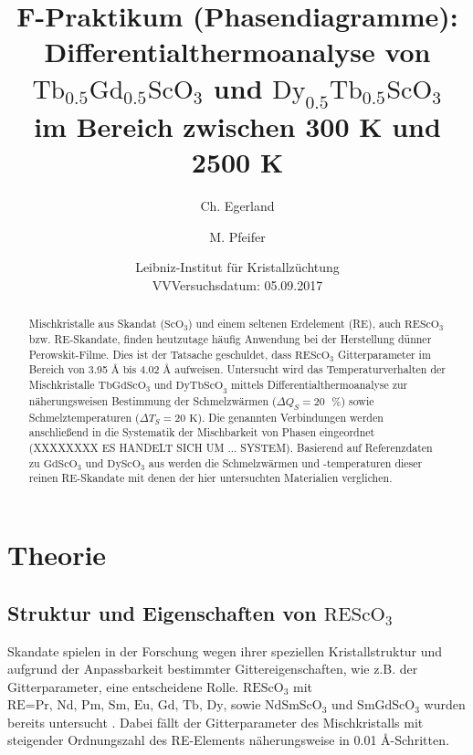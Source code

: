 \documentclass[aps,twocolumn,secnumarabic,nobalancelastpage,amsmath,amssymb,
nofootinbib,superscriptaddress]{revtex4-1}
\begin{document}
\title{F-Praktikum (Phasendiagramme):\\Differentialthermoanalyse von $\text{Tb}_{0.5}\text{Gd}_{0.5}\text{ScO}_3$
und $\text{Dy}_{0.5}\text{Tb}_{0.5}\text{ScO}_3$\\im Bereich zwischen 300 K und 2500 K}
\author         {Ch. Egerland}
\author         {M. Pfeifer}
\date[Versuchsort: ]{Leibniz-Institut für Kristallzüchtung \\ VVVersuchsdatum: 05.09.2017}

\begin{abstract}
Mischkristalle aus Skandat ($\text{ScO}_3$) und einem seltenen Erdelement (RE), auch $\text{REScO}_3$ bzw. RE-Skandate, finden heutzutage häufig Anwendung bei der Herstellung
dünner Perowskit-Filme. Dies ist der Tatsache geschuldet, dass $\text{REScO}_3$ Gitterparameter im Bereich von 3.95 \AA$\text{ bis}$ 4.02 \AA$\text{ aufweisen.}$
Untersucht wird das Temperaturverhalten der Mischkristalle $\text{TbGdScO}_3$ und $\text{DyTbScO}_3$ mittels
Differentialthermoanalyse zur näherungsweisen Bestimmung der Schmelzwärmen ($\Delta Q_S=20\text{ }\%$) sowie Schmelztemperaturen ($\Delta T_S=20\text{ K}$).
Die genannten Verbindungen werden anschließend in die Systematik der Mischbarkeit von Phasen eingeordnet (XXXXXXXX ES HANDELT SICH UM ... SYSTEM).
Basierend auf Referenzdaten zu $\text{Gd}\text{ScO}_3$ und $\text{Dy}\text{ScO}_3$ aus \cite{paperK} werden die Schmelzwärmen und -temperaturen dieser
reinen RE-Skandate mit denen der hier untersuchten Materialien verglichen.
\end{abstract}


\maketitle


\section{Theorie}
\subsection{Struktur und Eigenschaften von $\text{REScO}_3$}
\noindent Skandate spielen in der Forschung wegen ihrer speziellen Kristallstruktur und aufgrund der Anpassbarkeit bestimmter Gittereigenschaften, wie z.B. der
Gitterparameter, eine entscheidene Rolle. $\text{REScO}_3$ mit $\text{RE=Pr, Nd, Pm, Sm, Eu, Gd, Tb, Dy}$, sowie $\text{NdSmScO}_3$ und $\text{SmGdScO}_3$ wurden bereits untersucht \cite{paperK}.
Dabei fällt der Gitterparameter des Mischkristalls mit steigender Ordnungszahl des RE-Elements näherungsweise in 0.01 \AA-Schritten. \cite{paperK}
\end{document}
